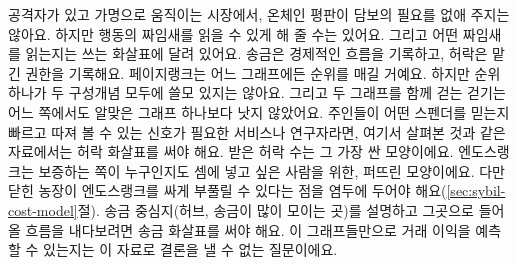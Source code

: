 공격자가 있고 가명으로 움직이는 시장에서, 온체인 평판이 담보의 필요를 없애 주지는 않아요. 하지만 행동의 짜임새를 읽을 수 있게 해 줄 수는 있어요. 그리고 어떤 짜임새를 읽는지는 쓰는 화살표에 달려 있어요. 송금은 경제적인 흐름을 기록하고, 허락은 맡긴 권한을 기록해요. 페이지랭크는 어느 그래프에든 순위를 매길 거예요. 하지만 순위 하나가 두 구성개념 모두에 쓸모 있지는 않아요. 그리고 두 그래프를 함께 걷는 걷기는 어느 쪽에서도 알맞은 그래프 하나보다 낫지 않았어요. 주인들이 어떤 스펜더를 믿는지 빠르고 따져 볼 수 있는 신호가 필요한 서비스나 연구자라면, 여기서 살펴본 것과 같은 자료에서는 허락 화살표를 써야 해요. 받은 허락 수는 그 가장 싼 모양이에요. 엔도스랭크는 보증하는 쪽이 누구인지도 셈에 넣고 싶은 사람을 위한, 퍼뜨린 모양이에요. 다만 닫힌 농장이 엔도스랭크를 싸게 부풀릴 수 있다는 점을 염두에 두어야 해요(\ref{sec:sybil-cost-model}절). 송금 중심지(허브, 송금이 많이 모이는 곳)를 설명하고 그곳으로 들어올 흐름을 내다보려면 송금 화살표를 써야 해요. 이 그래프들만으로 거래 이익을 예측할 수 있는지는 이 자료로 결론을 낼 수 없는 질문이에요.
